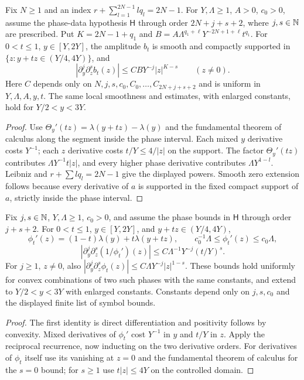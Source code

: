 \begin{lemma}
  \label{lem:c03_mult_amplitude_symbol}
  Fix $N\ge1$ and an index $r+\sum_{l=1}^{2N-1}lq_l=2N-1$.
  For $Y,\Lambda\ge1$, $A>0$, $c_0>0$, assume the phase-data hypothesis $\mathsf H$
  through order $2N+j+s+2$, where $j,s\in\mathbb{N}$ are prescribed.
  Put $K=2N-1+q_1$ and $B=A\Lambda^{q_1+\ell}Y^{-2N+1+\ell}t^{q_1}$.
  For $0<t\le1$, $y\in[Y,2Y]$, the amplitude $b_t$ is smooth and compactly supported in
  $\{z:y+tz\in(Y/4,4Y)\}$, and
  \[
    |\partial_y^j\partial_z^s b_t(z)|\le C B Y^{-j}|z|^{K-s}\qquad(z\ne0).
  \]
  Here $C$ depends only on $N,j,s,c_0,C_0,\ldots,C_{2N+j+s+2}$ and is uniform in $Y,\Lambda,A,y,t$.
  The same local smoothness and estimates, with enlarged constants, hold for $Y/2<y<3Y$.
\end{lemma}
\begin{proof}
  Use $\Theta_y'(tz)=\lambda(y+tz)-\lambda(y)$ and the fundamental theorem of calculus
  along the segment inside the phase interval. Each mixed $y$ derivative costs $Y^{-1}$;
  each $z$ derivative costs $t/Y\le4/|z|$ on the support. The factor $\Theta_y'(tz)$
  contributes $\Lambda Y^{-1}t|z|$, and every higher phase derivative contributes
  $\Lambda Y^{1-l}$. Leibniz and $r+\sum lq_l=2N-1$ give the displayed powers.
  Smooth zero extension follows because every derivative of $a$ is supported in the fixed compact
  support of $a$, strictly inside the phase interval.
\end{proof}

\begin{lemma}
  \label{lem:c03_mult_phase_symbol}
  Fix $j,s\in\mathbb{N}$, $Y,\Lambda\ge1$, $c_0>0$, and assume the phase bounds in $\mathsf H$
  through order $j+s+2$. For $0<t\le1$, $y\in[Y,2Y]$, and $y+tz\in(Y/4,4Y)$,
  \[
    \phi_t'(z)=(1-t)\lambda(y)+t\lambda(y+tz),\qquad
    c_0^{-1}\Lambda\le\phi_t'(z)\le c_0\Lambda,
  \]
  \[
    |\partial_y^j\partial_z^s(1/\phi_t')(z)|
       \le C\Lambda^{-1}Y^{-j}(t/Y)^s.
  \]
  For $j\ge1$, $z\ne0$, also
  $|\partial_y^j\partial_z^s\phi_t(z)|\le C\Lambda Y^{-j}|z|^{1-s}$.
  These bounds hold uniformly for convex combinations of two such phases with the same constants,
  and extend to $Y/2<y<3Y$ with enlarged constants. Constants depend only on $j,s,c_0$
  and the displayed finite list of symbol bounds.
\end{lemma}
\begin{proof}
  The first identity is direct differentiation and positivity follows by convexity.
  Mixed derivatives of $\phi_t'$ cost $Y^{-1}$ in $y$ and $t/Y$ in $z$.
  Apply the reciprocal recurrence, now inducting on the two derivative orders.
  For derivatives of $\phi_t$ itself use its vanishing at $z=0$ and the fundamental theorem
  of calculus for the $s=0$ bound; for $s\ge1$ use $t|z|\le4Y$ on the controlled domain.
\end{proof}


